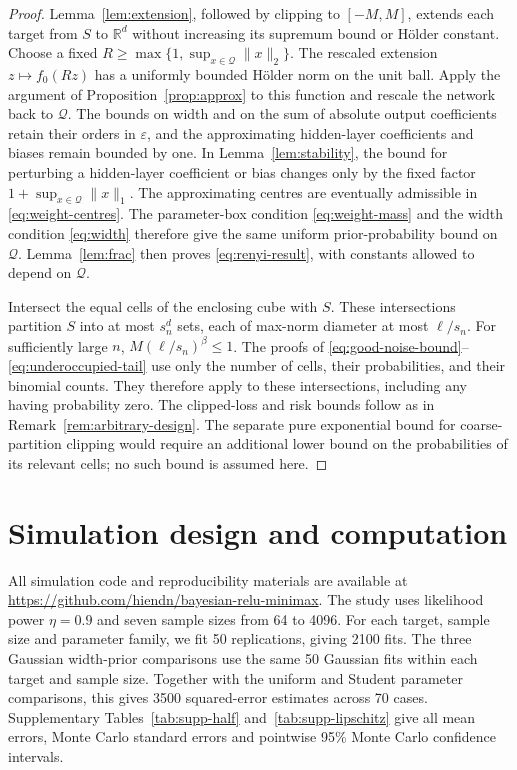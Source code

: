 \documentclass[11pt,a4paper]{article}
\theoremstyle{remark}
\newcommand{\norm}[1]{\lVert#1\rVert}
\begin{document}
\begingroup
\begin{proof}
Lemma~\ref{lem:extension}, followed by clipping to $[-M,M]$,
extends each target from $S$ to $\mathbb R^d$ without increasing
its supremum bound or H\"older constant.
Choose a fixed
$R\geq\max\{1,\sup_{x\in\mathcal Q}\norm x_2\}$.
The rescaled extension $z\mapsto f_0(Rz)$ has a uniformly bounded
H\"older norm on the unit ball. Apply the argument of
Proposition~\ref{prop:approx} to this function and rescale the network
back to $\mathcal Q$.
The bounds on width and on the sum of absolute output coefficients retain their
orders in $\varepsilon$, and the approximating {hidden-layer coefficients and biases}
remain bounded by one.
In Lemma~\ref{lem:stability}, the bound for perturbing {a hidden-layer coefficient or bias changes only} by the fixed factor
$1+\sup_{x\in\mathcal Q}\norm x_1$.
The approximating centres are eventually admissible in
\eqref{eq:weight-centres}. The parameter-box condition
\eqref{eq:weight-mass} and the width condition \eqref{eq:width}
therefore give the same uniform prior-probability bound on $\mathcal Q$.
Lemma~\ref{lem:frac} then proves \eqref{eq:renyi-result}, with
constants allowed to depend on $\mathcal Q$.

Intersect the equal cells of the enclosing cube with $S$.
These intersections partition $S$ into at most $s_n^d$
sets, each of max-norm diameter at most $\ell/s_n$.
For sufficiently large $n$, $M(\ell/s_n)^\beta\leq1$.
The proofs of \eqref{eq:good-noise-bound}--\eqref{eq:underoccupied-tail}
use only the number of cells, their probabilities, and their
binomial counts. They therefore apply to these intersections,
including any having probability zero.
The clipped-loss and risk bounds follow as in
Remark~\ref{rem:arbitrary-design}.
The separate pure exponential bound for coarse-partition clipping
would require an additional lower bound on the probabilities of
its relevant cells; no such bound is assumed here.
\end{proof}
\endgroup

\section{Simulation design and computation}\label{app:simulation}

All simulation code and reproducibility materials are available at\\
\mbox{\url{https://github.com/hiendn/bayesian-relu-minimax}}.
The study uses likelihood power $\eta=0.9$ and seven sample sizes from
64 to 4096. For each target, sample size and parameter family, we fit
50 replications, giving 2100 fits. The three Gaussian width-prior
comparisons use the same 50 Gaussian fits within each target and sample
size. Together with the uniform and Student parameter comparisons, this
gives 3500 squared-error estimates across 70 cases. Supplementary Tables~\ref{tab:supp-half}
and~\ref{tab:supp-lipschitz} give all mean errors, Monte Carlo standard
errors and pointwise 95\% Monte Carlo confidence intervals.
\end{document}
